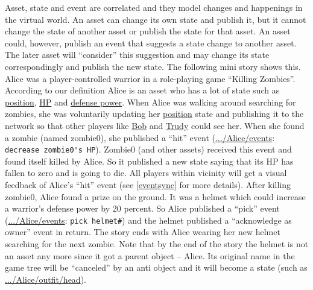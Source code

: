 Asset, state and event are correlated and they model changes and happenings in the virtual world. An asset can change its own state and publish it, but it cannot change the state of another asset or publish the state for that asset. An asset could, however, publish an event that suggests a state change to another asset. The later asset will ``consider'' this suggestion and may change its state correspondingly and publish the new state. The following mini story shows this. Alice was a player-controlled warrior in a role-playing game ``Killing Zombies''. According to our definition Alice is an asset who has a lot of state such as \url{position}, \url{HP} and \url{defense power}. When Alice was walking around searching for zombies, she was voluntarily updating her \url{position} state and publishing it to the network so that other players like \url{Bob} and \url{Trudy} could see her. When she found a zombie (named zombie0), she published a ``hit'' event (\url{.../Alice/events}: \verb|decrease zombie0's HP|). Zombie0 (and other assets) received this event and found itself killed by Alice. So it published a new state saying that its HP has fallen to zero and is going to die. All players within vicinity will get a visual feedback of Alice's ``hit'' event (see \ref{eventsync} for more details). After killing zombie0, Alice found a prize on the ground. It was a helmet which could increase a warrior's defense power by 20 percent. So Alice published a ``pick'' event (\url{.../Alice/events}: \verb|pick helmet#|) and the helmet published a ``acknowledge as owner'' event in return. The story ends with Alice wearing her new helmet searching for the next zombie. Note that by the end of the story the helmet is not an asset any more since it got a parent object -- Alice. Its original name in the game tree will be ``canceled'' by an anti object and it will become a state (such as \url{.../Alice/outfit/head}).




